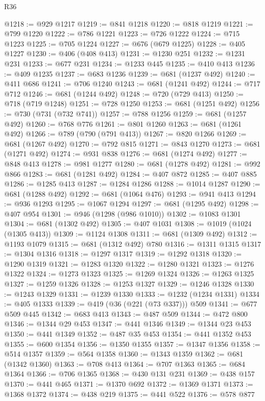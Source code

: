 \begin{lexlean}{R36}
\begin{coremodule}
@1218 := @929 @1217
@1219 := @841 @1218
@1220 := @818 @1219
@1221 := @799 @1220
@1222 := @786 @1221
@1223 := @726 @1222
@1224 := @715 @1223
@1225 := @705 @1224
@1227 := @676 (@679 @1225)
@1228 := @405 @1227
@1230 := @406 (@408 @413)
@1231 := @1230 @251
@1232 := @1231 @231
@1233 := @677 @231
@1234 := @1233 @445
@1235 := @410 @413
@1236 := @409 @1235
@1237 := @683 @1236
@1239 := @681 (@1237 @492)
@1240 := @411 @686
@1241 := @706 @1240
@1243 := @681 (@1241 @492)
@1244 := @717 @712
@1246 := @681 (@1244 @492)
@1248 := @720 (@729 @413)
@1250 := @718 (@719 @1248)
@1251 := @728 @1250
@1253 := @681 (@1251 @492)
@1256 := @730 (@731 (@732 @741))
@1257 := @788 @1256
@1259 := @681 (@1257 @492)
@1260 := @768 @776
@1261 := @801 @1260
@1263 := @681 (@1261 @492)
@1266 := @789 (@790 (@791 @413))
@1267 := @820 @1266
@1269 := @681 (@1267 @492)
@1270 := @792 @815
@1271 := @843 @1270
@1273 := @681 (@1271 @492)
@1274 := @931 @838
@1276 := @681 (@1274 @492)
@1277 := @848 @413
@1278 := @981 @1277
@1280 := @681 (@1278 @492)
@1281 := @992 @866
@1283 := @681 (@1281 @492)
@1284 := @407 @872
@1285 := @407 @885
@1286 := @1285 @413
@1287 := @1284 @1286
@1288 := @1014 @1287
@1290 := @681 (@1288 @492)
@1292 := @681 (@1064 @476)
@1293 := @941 @413
@1294 := @936 @1293
@1295 := @1067 @1294
@1297 := @681 (@1295 @492)
@1298 := @407 @954
@1301 := @946 (@1298 (@986 @1010))
@1302 := @1083 @1301
@1304 := @681 (@1302 @492)
@1305 := @407 @1031
@1308 := @1019 (@1024 (@1305 @413))
@1309 := @1124 @1308
@1311 := @681 (@1309 @492)
@1312 := @1193 @1079
@1315 := @681 (@1312 @492) @780
@1316 := @1311 @1315
@1317 := @1304 @1316
@1318 := @1297 @1317
@1319 := @1292 @1318
@1320 := @1290 @1319
@1321 := @1283 @1320
@1322 := @1280 @1321
@1323 := @1276 @1322
@1324 := @1273 @1323
@1325 := @1269 @1324
@1326 := @1263 @1325
@1327 := @1259 @1326
@1328 := @1253 @1327
@1329 := @1246 @1328
@1330 := @1243 @1329
@1331 := @1239 @1330
@1333 := @1232 (@1234 @1331)
@1334 := @405 @1333
@1339 := @419 (@36 (@221 (@73 @337))) @509
@1341 := @677 @509 @445
@1342 := @683 @413
@1343 := @487 @509
@1344 := @472 @800
@1346 := @1344 @29 @453
@1347 := @441 @1346
@1349 := @1344 @23 @453
@1350 := @441 @1349
@1352 := @487 @35 @453
@1354 := @441 @1352 @453
@1355 := @600 @1354
@1356 := @1350 @1355
@1357 := @1347 @1356
@1358 := @514 @1357
@1359 := @564 @1358
@1360 := @1343 @1359
@1362 := @681 (@1342 @1360)
@1363 := @708 @413
@1364 := @707 @1363
@1365 := @684 @1364
@1366 := @706 @1365
@1368 := @430 @131 @231
@1369 := @438 @157
@1370 := @441 @465
@1371 := @1370 @692
@1372 := @1369 @1371
@1373 := @1368 @1372
@1374 := @438 @219
@1375 := @441 @522
@1376 := @578 @877

\end{coremodule}
\end{lexlean}
